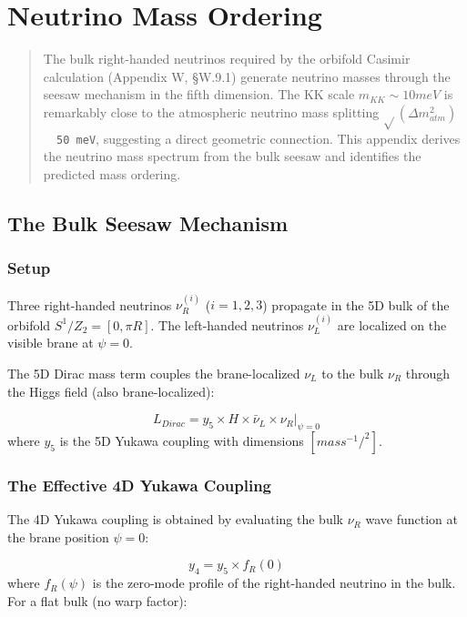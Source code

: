 \documentclass[aps,prd,preprint,superscriptaddress,longbibliography,floatfix]{revtex4-2}
\theoremstyle{remark}
\begin{document}
\section{Neutrino Mass Ordering}


\begin{quote}
The bulk right-handed neutrinos required by the orbifold Casimir
calculation (Appendix W, \S{}W.9.1) generate neutrino masses through the
seesaw mechanism in the fifth dimension. The KK scale $m_{KK} \sim  10 meV$ is
remarkably close to the atmospheric neutrino mass splitting $\sqrt{}(\Delta m^{2}_{atm})$
\texttt{~ 50 meV}, suggesting a direct geometric connection. This appendix
derives the neutrino mass spectrum from the bulk seesaw and identifies
the predicted mass ordering.
\end{quote}



\subsection{The Bulk Seesaw Mechanism}


\subsubsection{Setup}

Three right-handed neutrinos $\nu_R^{(i)}$ ($i = 1, 2, 3$) propagate in the 5D bulk of the orbifold $S^{1}/Z_{2} = [0, \pi R]$. The left-handed neutrinos $\nu_L^{(i)}$ are localized on the visible brane at $\psi = 0$.

The 5D Dirac mass term couples the brane-localized $\nu_L$ to the bulk $\nu_R$ through the Higgs field (also brane-localized):


\begin{equation}
    L_{Dirac} = y_{5} \times H \times \bar{\nu}_L \times \nu_R |_{\psi=0}
\end{equation}
where $y_{5}$ is the 5D Yukawa coupling with dimensions $[mass^{-1}/^{2}]$.


\subsubsection{The Effective 4D Yukawa Coupling}

The 4D Yukawa coupling is obtained by evaluating the bulk $\nu_R$ wave function at the brane position $\psi = 0$:


\begin{equation}
    y_{4} = y_{5} \times f_R(0)
\end{equation}
where $f_R(\psi)$ is the zero-mode profile of the right-handed neutrino in the bulk. For a flat bulk (no warp factor):
\end{document}

